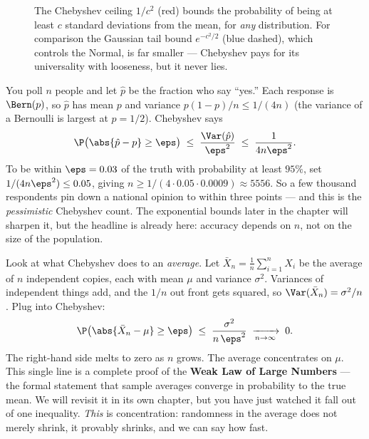 \begin{figure}[H]
\centering
{}
\caption{The Chebyshev ceiling $1/c^2$ (red) bounds the probability of being
at least $c$ standard deviations from the mean, for \emph{any} distribution.
For comparison the Gaussian tail bound $e^{-c^2/2}$ (blue dashed), which
controls the Normal, is far smaller --- Chebyshev pays for its universality
with looseness, but it never lies.}
\label{ch19:fig-cheb}
\end{figure}

\begin{example}
\label{ch19:ex-poll}
You poll $n$ people and let $\hat p$ be the fraction who say ``yes.'' Each
response is $\Bern(p)$, so $\hat p$ has mean $p$ and variance
$p(1-p)/n \le 1/(4n)$ (the variance of a Bernoulli is largest at $p=1/2$).
Chebyshev says
\[
  \P\bigl(\abs{\hat p - p} \ge \eps\bigr)
  \;\le\; \frac{\Var(\hat p)}{\eps^2}
  \;\le\; \frac{1}{4n\eps^2}.
\]
To be within $\eps = 0.03$ of the truth with probability at least $95\%$, set
$1/(4n\eps^2) \le 0.05$, giving $n \ge 1/(4\cdot 0.05 \cdot 0.0009) \approx
5556$. So a few thousand respondents pin down a national opinion to within
three points --- and this is the \emph{pessimistic} Chebyshev count. The
exponential bounds later in the chapter will sharpen it, but the headline is
already here: accuracy depends on $n$, not on the size of the population.
\end{example}

\begin{happeningbox}
Look at what Chebyshev does to an \emph{average}. Let
$\bar X_n = \frac1n\sum_{i=1}^n X_i$ be the average of $n$ independent copies,
each with mean $\mu$ and variance $\sigma^2$. Variances of independent things
add, and the $1/n$ out front gets squared, so
$\Var(\bar X_n) = \sigma^2/n$. Plug into Chebyshev:
\[
  \P\bigl(\abs{\bar X_n - \mu} \ge \eps\bigr)
  \;\le\; \frac{\sigma^2}{n\,\eps^2}
  \;\xrightarrow[n\to\infty]{}\; 0.
\]
The right-hand side melts to zero as $n$ grows. The average concentrates on
$\mu$. This single line is a complete proof of the \textbf{Weak Law of Large
Numbers} --- the formal statement that sample averages converge in
probability to the true mean. We will revisit it in its own chapter, but you
have just watched it fall out of one inequality. \emph{This} is concentration:
randomness in the average does not merely shrink, it provably shrinks, and we
can say how fast.
\end{happeningbox}

